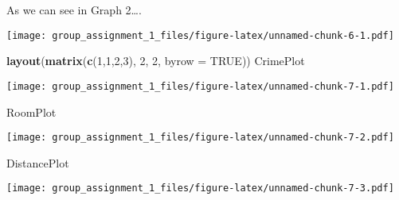\documentclass[
]{article}
\newenvironment{Shaded}{\begin{snugshade}}{\end{snugshade}}
\newcommand{\DataTypeTok}[1]{\textcolor[rgb]{0.13,0.29,0.53}{#1}}
\newcommand{\DecValTok}[1]{\textcolor[rgb]{0.00,0.00,0.81}{#1}}
\newcommand{\KeywordTok}[1]{\textcolor[rgb]{0.13,0.29,0.53}{\textbf{#1}}}
\newcommand{\NormalTok}[1]{#1}
\newcommand{\OtherTok}[1]{\textcolor[rgb]{0.56,0.35,0.01}{#1}}
\begin{document}
As we can see in Graph 2\ldots{}.

\texttt{[image: group\_assignment\_1\_files/figure-latex/unnamed-chunk-6-1.pdf]}

\begin{Shaded}
\begin{Highlighting}[]
\KeywordTok{layout}\NormalTok{(}\KeywordTok{matrix}\NormalTok{(}\KeywordTok{c}\NormalTok{(}\DecValTok{1}\NormalTok{,}\DecValTok{1}\NormalTok{,}\DecValTok{2}\NormalTok{,}\DecValTok{3}\NormalTok{), }\DecValTok{2}\NormalTok{, }\DecValTok{2}\NormalTok{, }\DataTypeTok{byrow =} \OtherTok{TRUE}\NormalTok{))}
\NormalTok{CrimePlot}
\end{Highlighting}
\end{Shaded}

\texttt{[image: group\_assignment\_1\_files/figure-latex/unnamed-chunk-7-1.pdf]}

\begin{Shaded}
\begin{Highlighting}[]
\NormalTok{RoomPlot}
\end{Highlighting}
\end{Shaded}

\texttt{[image: group\_assignment\_1\_files/figure-latex/unnamed-chunk-7-2.pdf]}

\begin{Shaded}
\begin{Highlighting}[]
\NormalTok{DistancePlot}
\end{Highlighting}
\end{Shaded}

\texttt{[image: group\_assignment\_1\_files/figure-latex/unnamed-chunk-7-3.pdf]}
\end{document}
